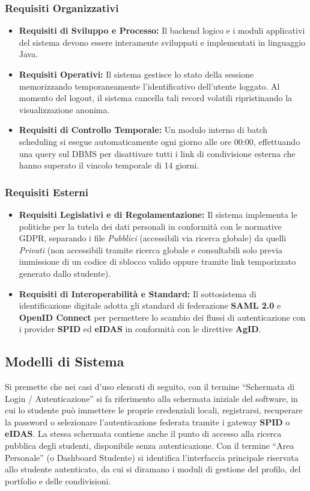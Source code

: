 \documentclass[12pt,a4paper]{article}
\begin{document}
\subsubsection{Requisiti Organizzativi}
\begin{itemize}
    \item \textbf{Requisiti di Sviluppo e Processo:} Il backend logico e i moduli applicativi del sistema devono essere interamente sviluppati e implementati in linguaggio Java.
    \item \textbf{Requisiti Operativi:} Il sistema gestisce lo stato della sessione memorizzando temporaneamente l'identificativo dell'utente loggato. Al momento del logout, il sistema cancella tali record volatili ripristinando la visualizzazione anonima.
    \item \textbf{Requisiti di Controllo Temporale:} Un modulo interno di batch scheduling si esegue automaticamente ogni giorno alle ore 00:00, effettuando una query sul DBMS per disattivare tutti i link di condivisione esterna che hanno superato il vincolo temporale di 14 giorni.
\end{itemize}

\subsubsection{Requisiti Esterni}
\begin{itemize}
    \item \textbf{Requisiti Legislativi e di Regolamentazione:} Il sistema implementa le politiche per la tutela dei dati personali in conformità con le normative GDPR, separando i file \textit{Pubblici} (accessibili via ricerca globale) da quelli \textit{Privati} (non accessibili tramite ricerca globale e consultabili solo previa immissione di un codice di sblocco valido oppure tramite link temporizzato generato dallo studente).
    \item \textbf{Requisiti di Interoperabilità e Standard:} Il sottosistema di identificazione digitale adotta gli standard di federazione \textbf{SAML 2.0} e \textbf{OpenID Connect} per permettere lo scambio dei flussi di autenticazione con i provider \textbf{SPID} ed \textbf{eIDAS} in conformità con le direttive \textbf{AgID}.
\end{itemize}
\subsection{Modelli di Sistema}
Si premette che nei casi d’uso elencati di seguito, con il termine ``Schermata di Login / Autenticazione'' si fa riferimento alla schermata iniziale del software, in cui lo studente può immettere le proprie credenziali locali, registrarsi, recuperare la password o selezionare l'autenticazione federata tramite i gateway \textbf{SPID} o \textbf{eIDAS}. La stessa schermata contiene anche il punto di accesso alla ricerca pubblica degli studenti, disponibile senza autenticazione. Con il termine ``Area Personale'' (o Dashboard Studente) si identifica l'interfaccia principale riservata allo studente autenticato, da cui si diramano i moduli di gestione del profilo, del portfolio e delle condivisioni. 
\end{document}
